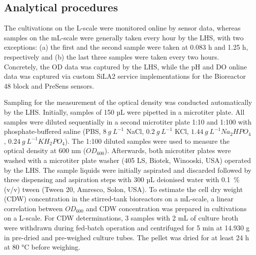 \documentclass[sn-standardnature]{sn-jnl}%
\theoremstyle{thmstyleone}%
\theoremstyle{thmstyletwo}%
\theoremstyle{thmstylethree}%
\begin{document}
\subsection{Analytical procedures}
The cultivations on the L-scale were monitored online by sensor data, whereas samples on the mL-scale were generally taken every hour by the LHS, with two exceptions:
(a) the first and the second sample were taken at 0.083 h and 1.25 h, respectively and (b) the last three samples were taken every two hours.
Concretely, the OD data was captured by the LHS, while the pH and DO online data was captured via custom SiLA2 service implementations for the Bioreactor 48 block and PreSens sensors.

Sampling for the measurement of the optical density was conducted automatically by the LHS.
Initially, samples of 150 µL were pipetted in a microtiter plate.
All samples were diluted sequentially in a second microtiter plate 1:10 and 1:100 with phosphate-buffered saline (PBS, $8\ g\ L^{-1}$ NaCl, $0.2\ g\ L^{-1}$ KCl, $1.44\ g\ L^{-1} Na_{2}HPO_{4}$, $0.24\ g\ L^{-1} KH_{2}PO_{4}$).
The 1:100 diluted samples were used to measure the optical density at 600 nm ($OD_{600}$).
Afterwards, both microtiter plates were washed with a microtiter plate washer (405 LS, Biotek, Winooski, USA) operated by the LHS.
The sample liquids were initially aspirated and discarded followed by three dispensing and aspiration steps with 300 µL deionised water with 0.1~\% (v/v) tween (Tween 20, Amresco, Solon, USA).
To estimate the cell dry weight (CDW) concentration in the stirred-tank bioreactors on a mL-scale, a linear correlation between $OD_{600}$ and CDW concentration was prepared in cultivations on a L-scale.
For CDW determinations, 3 samples with 2 mL of culture broth were withdrawn during fed-batch operation and centrifuged for 5 min at 14.930 g in pre-dried and pre-weighed culture tubes.
The pellet was dried for at least 24 h at 80 °C before weighing.
\end{document}
